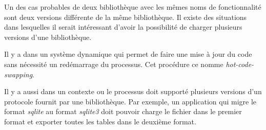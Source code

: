 Un des cas probables de deux bibliothèque avec les mêmes noms de fonctionnalité
sont deux versions différente de la même bibliothèque. Il existe des situations
dans lesquelles il serait intéressant d'avoir la possibilité de charger plusieurs
versions d'une bibliothèque.

Il y a dans un système dynamique qui permet de faire une mise à jour du
code sans nécessité un redémarrage du processus. Cet procédure ce nomme
\textit{hot-code-swapping}.

Il y a aussi dans un contexte ou le processus doit supporté plusieurs versions
d'un protocole fournit par une bibliothèque. Par exemple, un application qui migre
le format \textit{sqlite} au format \textit{sqlite3} doit pouvoir charge le fichier
dans le premier format et exporter toutes les tables dans le deuxième format.

